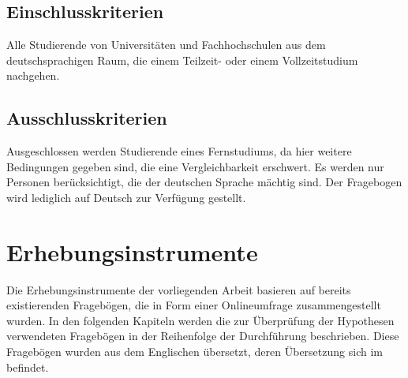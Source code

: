 \subsection{Einschlusskriterien}\label{subsection.einschlusskriterien}
Alle Studierende von Universitäten und Fachhochschulen aus dem deutschsprachigen Raum, die einem Teilzeit- oder einem Vollzeitstudium nachgehen.
\subsection{Ausschlusskriterien}\label{subsection.ausschlusskriterien}
Ausgeschlossen werden Studierende eines Fernstudiums, da hier weitere Bedingungen gegeben sind, die eine Vergleichbarkeit erschwert. Es werden nur Personen berücksichtigt, die der deutschen Sprache mächtig sind. Der Fragebogen wird lediglich auf Deutsch zur Verfügung gestellt.


\section{Erhebungsinstrumente}\label{section.erhebungsinstrumente}
Die Erhebungsinstrumente der vorliegenden Arbeit basieren auf bereits existierenden Fragebögen, die in Form einer Onlineumfrage zusammengestellt wurden. In den folgenden Kapiteln werden die zur Überprüfung der Hypothesen verwendeten Fragebögen in der Reihenfolge der Durchführung beschrieben. Diese Fragebögen wurden aus dem Englischen übersetzt, deren Übersetzung sich im  befindet.
